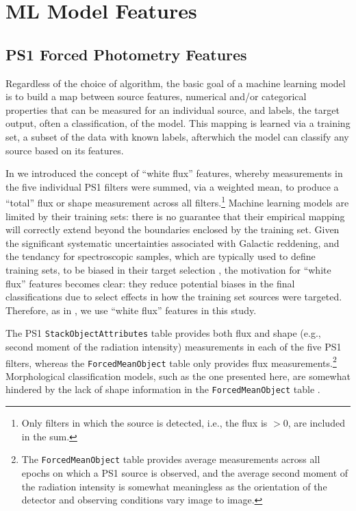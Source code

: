 \documentclass[twocolumn]{aastex63}
\begin{document}
\section{ML Model Features}

\subsection{PS1 Forced Photometry Features}\label{sec:features}

Regardless of the choice of algorithm, the basic goal of a machine learning
model is to build a map between source features, numerical and/or categorical
properties that can be measured for an individual source, and labels, the
target output, often a classification, of the model. This mapping is learned
via a training set, a subset of the data with known labels, afterwhich the
model can classify any source based on its features.

In \citet{Tachibana18} we introduced the concept of ``white flux'' features,
whereby measurements in the five individual PS1 filters  were
summed, via a weighted mean, to produce a ``total'' flux or shape measurement
across all filters.\footnote{Only filters in which the source is detected,
i.e., the flux is $> 0$, are included in the sum.} Machine learning models are
limited by their training sets: there is no guarantee that their empirical
mapping will correctly extend beyond the boundaries enclosed by the training
set. Given the significant systematic uncertainties associated with Galactic
reddening, and the tendancy for spectroscopic samples, which are typically
used to define training sets, to be biased in their target selection
\citep[see e.g.,][]{Miller17}, the motivation for ``white flux'' features
becomes clear: they reduce potential biases in the final classifications due
to select effects in how the training set sources were targeted. Therefore, as
in \citet{Tachibana18}, we use ``white flux'' features in this study.

The PS1 \texttt{StackObjectAttributes} table provides both flux and shape
(e.g., second moment of the radiation intensity) measurements in each of the
five PS1 filters, whereas the \texttt{ForcedMeanObject} table only provides
flux measurements.\footnote{The \texttt{ForcedMeanObject} table provides
average measurements across all epochs on which a PS1 source is observed, and
the average second moment of the radiation intensity is somewhat meaningless
as the orientation of the detector and observing conditions vary image to
image.} Morphological classification models, such as the one presented here,
are somewhat hindered by the lack of shape information in the
\texttt{ForcedMeanObject} table \citep[see for example the different shape
features in Figure~2 of][]{Tachibana18}. 
\end{document}
